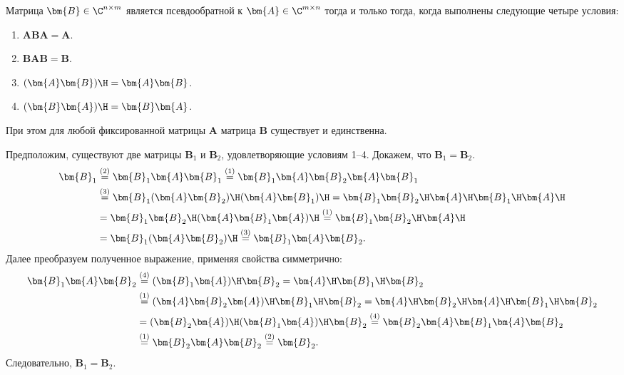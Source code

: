 \begin{tcbtheorem}
\label{thm:penrose-conditions}
    Матрица $\bm{B} \in \C^{n \times m}$ является псевдообратной к $\bm{A} \in \C^{m \times n}$ тогда и только тогда, когда выполнены следующие четыре условия:
    \begin{enumerate}
        \item $\bm{A}\bm{B}\bm{A} = \bm{A}$.
        \item $\bm{B}\bm{A}\bm{B} = \bm{B}$.
        \item $(\bm{A}\bm{B})\H = \bm{A}\bm{B}$.
        \item $(\bm{B}\bm{A})\H = \bm{B}\bm{A}$.
    \end{enumerate}
    При этом для любой фиксированной матрицы $\bm{A}$ матрица $\bm{B}$ существует и единственна.
\end{tcbtheorem}

\begin{tcbproof}
    Предположим, существуют две матрицы $\bm{B}_1$ и $\bm{B}_2$, удовлетворяющие условиям 1--4. Докажем, что $\bm{B}_1 = \bm{B}_2$.
    \begin{align*}
        \bm{B}_1 &\overset{(2)}{=} \bm{B}_1 \bm{A} \bm{B}_1 \overset{(1)}{=} \bm{B}_1 \bm{A} \bm{B}_2 \bm{A} \bm{B}_1 \\
        &\overset{(3)}{=} \bm{B}_1 (\bm{A} \bm{B}_2)\H (\bm{A} \bm{B}_1)\H = \bm{B}_1 \bm{B}_2\H \bm{A}\H \bm{B}_1\H \bm{A}\H \\
        &= \bm{B}_1 \bm{B}_2\H (\bm{A} \bm{B}_1 \bm{A})\H \overset{(1)}{=} \bm{B}_1 \bm{B}_2\H \bm{A}\H \\
        &= \bm{B}_1 (\bm{A} \bm{B}_2)\H \overset{(3)}{=} \bm{B}_1 \bm{A} \bm{B}_2.
    \end{align*}
    Далее преобразуем полученное выражение, применяя свойства симметрично:
    \begin{align*}
        \bm{B}_1 \bm{A} \bm{B}_2 &\overset{(4)}{=} (\bm{B}_1 \bm{A})\H \bm{B}_2 = \bm{A}\H \bm{B}_1\H \bm{B}_2 \\
        &\overset{(1)}{=} (\bm{A} \bm{B}_2 \bm{A})\H \bm{B}_1\H \bm{B}_2 = \bm{A}\H \bm{B}_2\H \bm{A}\H \bm{B}_1\H \bm{B}_2 \\
        &= (\bm{B}_2 \bm{A})\H (\bm{B}_1 \bm{A})\H \bm{B}_2 \overset{(4)}{=} \bm{B}_2 \bm{A} \bm{B}_1 \bm{A} \bm{B}_2 \\
        &\overset{(1)}{=} \bm{B}_2 \bm{A} \bm{B}_2 \overset{(2)}{=} \bm{B}_2.
    \end{align*}
    Следовательно, $\bm{B}_1 = \bm{B}_2$.
\end{tcbproof}

